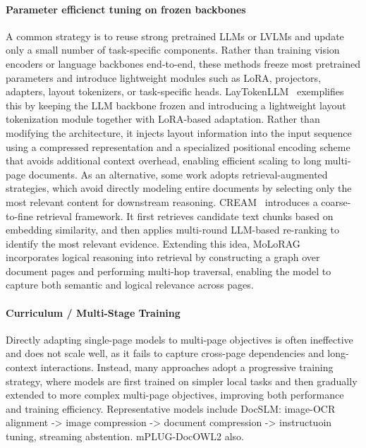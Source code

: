 \documentclass[11pt]{article}
\begin{document}
\paragraph{Parameter efficienct tuning on frozen backbones}
A common strategy is to reuse strong pretrained LLMs or LVLMs and update only a small number of task-specific components. Rather than training vision encoders or language backbones end-to-end, these methods freeze most pretrained parameters and introduce lightweight modules such as LoRA, projectors, adapters, layout tokenizers, or task-specific heads. 
LayTokenLLM~\cite{Zhu2025-jb-laytokenllm} exemplifies this by keeping the LLM backbone frozen and introducing a lightweight layout tokenization module together with LoRA-based adaptation. Rather than modifying the architecture, it injects layout information into the input sequence using a compressed representation and a specialized positional encoding scheme that avoids additional context overhead, enabling efficient scaling to long multi-page documents. As an alternative, some work adopts retrieval-augmented strategies, which avoid directly modeling entire documents by selecting only the most relevant content for downstream reasoning. CREAM~\cite{Zhang2024-zs-cream} introduces a coarse-to-fine retrieval framework. It first retrieves candidate text chunks based on embedding similarity, and then applies multi-round LLM-based re-ranking to identify the most relevant evidence. Extending this idea, MoLoRAG~\cite{Wu2025-mi-molorag} incorporates logical reasoning into retrieval by constructing a graph over document pages and performing multi-hop traversal, enabling the model to capture both semantic and logical relevance across pages.


\paragraph{Curriculum / Multi-Stage Training}
Directly adapting single-page models to multi-page objectives is often ineffective and does not scale well, as it fails to capture cross-page dependencies and long-context interactions.
Instead, many approaches adopt a progressive training strategy, where models are first trained on simpler local tasks and then gradually extended to more complex multi-page objectives, improving both performance and training efficiency.
Representative models include DocSLM: image-OCR alignment -> image compression -> document compression -> instructuoin tuning, streaming abstention.
mPLUG-DocOWL2 also.
\end{document}
